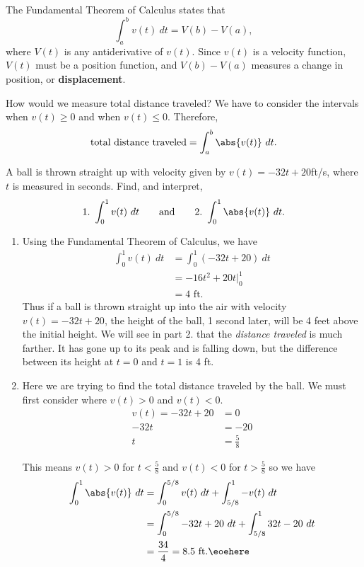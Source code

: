 The Fundamental Theorem of Calculus states that
\[\int_a^b v(t)\ dt = V(b) - V(a),\]
where $V(t)$ is any antiderivative of $v(t)$. Since $v(t)$ is a velocity function, $V(t)$ must be a position function, and $V(b) - V(a)$ measures a change in position, or \textbf{displacement}.

How would we measure total distance traveled? We have to consider the intervals when $v(t)\geq 0$ and when $v(t)\leq 0$. Therefore,
\[\text{total distance traveled}=\int_a^b\abs{v(t)}\ dt.\]\bigskip

\begin{example}\label{ex_ftcmotion1}
A ball is thrown straight up with velocity given by $v(t) = -32t+20$ft/s, where $t$ is measured in seconds. Find, and interpret,
\[1.\ \int_0^1 v(t)\ dt\qquad\text{and}\qquad 2.\ \int_0^1\abs{v(t)}\ dt.\]
\solution
\begin{enumerate}
\item Using the Fundamental Theorem of Calculus, we have 
\begin{align*}
	\int_0^1 v(t)\ dt &= \int_0^1 (-32t+20)\ dt \\
	&= -16t^2 + 20t\Big|_0^1 \\
	&= 4\text{ ft}.
\end{align*}
Thus if a ball is thrown straight up into the air with velocity $v(t) = -32t+20$, the height of the ball, 1 second later, will be 4 feet above the initial height. We will see in part 2. that the \textit{distance traveled} is much farther. It has gone up to its peak and is falling down, but the difference between its height at $t=0$ and $t=1$ is 4 ft.

\item Here we are trying to find the total distance traveled by the ball. We must first consider where $v(t)>0$ and $v(t)<0$.  
\begin{align*}
v(t)=-32t+20&=0\\
-32t&=-20\\
t&=\frac{5}{8}
\end{align*}

This means $v(t)>0$ for $t<\frac{5}{8}$ and $v(t)<0$ for $t>\frac{5}{8}$ so we have 
\begin{align*}
\int_0^1 \abs{v(t)}\ dt
&=\int_0^{5/8} v(t)\ dt + \int_{5/8}^1 -v(t)\ dt\\
&=\int_0^{5/8} -32t+20\ dt + \int_{5/8}^1 32t-20\ dt\\
&=\frac{34}{4}=8.5 \text{ ft}.\eoehere
\end{align*}
\end{enumerate}
\end{example}


